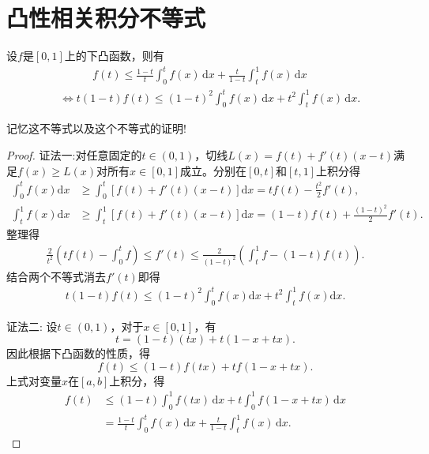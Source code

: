 \documentclass[../../main.tex]{subfiles}%
\begin{document}
\section{凸性相关积分不等式}

\begin{proposition}\label{proposition:凸性积分不等式}
设\( f \)是\([0,1]\)上的下凸函数，则有
\begin{align*}
&\qquad \quad  f(t) \leqslant \frac{1-t}{t} \int_0^t f(x)\,\text{d}x + \frac{t}{1-t}\int_t^1 f(x)\,\text{d}x
\\
&\iff t(1 - t)f(t) \leqslant (1 - t)^2 \int_{0}^{t} f(x) \, \mathrm{d}x + t^2 \int_{t}^{1} f(x) \, \mathrm{d}x.
\end{align*}
\end{proposition}
\begin{note}
记忆这不等式以及这个不等式的证明!
\end{note}
\begin{proof}

{\color{blue}证法一:}对任意固定的$t\in(0,1)$，切线$L(x)=f(t)+f'(t)(x-t)$满足$f(x)\geqslant L(x)$对所有$x\in[0,1]$成立。分别在$[0,t]$和$[t,1]$上积分得
\begin{align*}
\int_{0}^{t}f(x)\mathrm{d}x&\geqslant\int_{0}^{t}\left[f(t)+f'(t)(x-t)\right]\mathrm{d}x=tf(t)-\frac{t^{2}}{2}f'(t),\\
\int_{t}^{1}f(x)\mathrm{d}x&\geqslant\int_{t}^{1}\left[f(t)+f'(t)(x-t)\right]\mathrm{d}x=(1-t)f(t)+\frac{(1-t)^{2}}{2}f'(t).
\end{align*}
整理得
\begin{align*}
\frac{2}{t^{2}}\left(tf(t)-\int_{0}^{t}f\right)\leqslant f'(t)\leqslant\frac{2}{(1-t)^{2}}\left(\int_{t}^{1}f-(1-t)f(t)\right).
\end{align*}
结合两个不等式消去$f'(t)$即得
\begin{align*}
t(1-t)f(t)\leqslant(1-t)^{2}\int_{0}^{t}f(x)\mathrm{d}x+t^{2}\int_{t}^{1}f(x)\mathrm{d}x.
\end{align*}

{\color{blue}证法二:}
设\( t \in (0,1) \)，对于\( x \in [0,1] \)，有
\[
t = (1-t)(tx) + t(1 - x + tx).
\]
因此根据下凸函数的性质，得
\[
f(t) \leqslant (1-t)f(tx) + tf(1 - x + tx).
\]
上式对变量\( x \)在\([a,b]\)上积分，得
\begin{align*}
f(t) &\leqslant (1-t)\int_0^1 f(tx)\,\text{d}x + t\int_0^1 f(1 - x + tx)\,\text{d}x \\
&= \frac{1-t}{t}\int_0^t{f(x)\,\mathrm{d}x}+\frac{t}{1-t}\int_t^1{f(x)\,\mathrm{d}x}.
\end{align*}
\end{proof}
\end{document}
